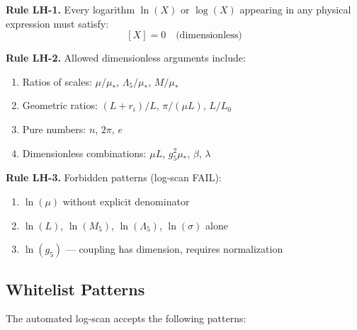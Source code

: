 \documentclass[11pt,a4paper]{article}
\theoremstyle{definition}
\begin{document}
\begin{hygienebox}
\textbf{Rule LH-1.} Every logarithm $\ln(X)$ or $\log(X)$ appearing in any
physical expression must satisfy:
\begin{equation}
\label{eq:lh1_rule}
[X] = 0 \quad \text{(dimensionless)}
\end{equation}

\textbf{Rule LH-2.} Allowed dimensionless arguments include:
\begin{enumerate}[label=(\roman*)]
\item Ratios of scales: $\mu/\mu_*$, $\Lambda_5/\mu_*$, $M/\mu_*$
\item Geometric ratios: $(L+r_i)/L$, $\pi/(\mu L)$, $L/L_0$
\item Pure numbers: $n$, $2\pi$, $e$
\item Dimensionless combinations: $\mu L$, $g_5^2 \mu_*$, $\beta$, $\lambda$
\end{enumerate}

\textbf{Rule LH-3.} Forbidden patterns (log-scan FAIL):
\begin{enumerate}[label=(\roman*)]
\item $\ln(\mu)$ without explicit denominator
\item $\ln(L)$, $\ln(M_5)$, $\ln(\Lambda_5)$, $\ln(\sigma)$ alone
\item $\ln(g_5)$ — coupling has dimension, requires normalization
\end{enumerate}
\end{hygienebox}

\subsection{Whitelist Patterns}
\label{subsec:whitelist}

The automated log-scan accepts the following patterns:
\end{document}

